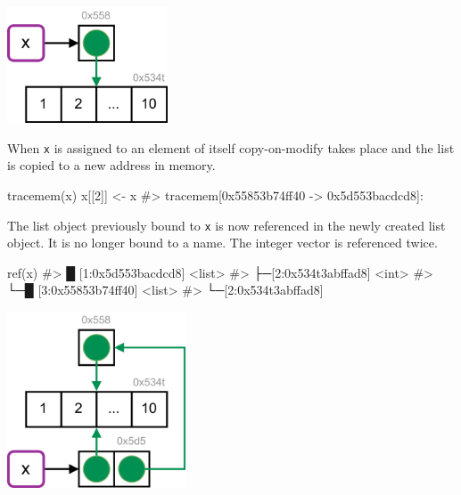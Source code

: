 \documentclass[
]{krantz}
\makeatletter
\newenvironment{Shaded}{\begin{snugshade}}{\end{snugshade}}
\newcommand{\CommentTok}[1]{\textcolor[rgb]{0.56,0.35,0.01}{\textit{#1}}}
\newcommand{\DecValTok}[1]{\textcolor[rgb]{0.00,0.00,0.81}{#1}}
\newcommand{\KeywordTok}[1]{\textcolor[rgb]{0.13,0.29,0.53}{\textbf{#1}}}
\newcommand{\NormalTok}[1]{#1}
\newcommand{\StringTok}[1]{\textcolor[rgb]{0.31,0.60,0.02}{#1}}
\newenvironment{kframe}{%
\medskip{}
\setlength{\fboxsep}{.8em}
 \def\at@end@of@kframe{}%
 \ifinner\ifhmode%
  \def\at@end@of@kframe{\end{minipage}}%
  \begin{minipage}{\columnwidth}%
 \fi\fi%
 \def\FrameCommand##1{\hskip\@totalleftmargin \hskip-\fboxsep
 \colorbox{shadecolor}{##1}\hskip-\fboxsep
     \hskip-\linewidth \hskip-\@totalleftmargin \hskip\columnwidth}%
 \MakeFramed {\advance\hsize-\width
   \@totalleftmargin\z@ \linewidth\hsize
   \@setminipage}}%
 {\par\unskip\endMakeFramed%
 \at@end@of@kframe}
\renewenvironment{Shaded}{\begin{kframe}}{\end{kframe}}
\renewcommand{\KeywordTok} [1]{\textcolor[rgb]{0.00,0.44,0.13}{{#1}}}
\renewcommand{\DecValTok}  [1]{\textcolor[rgb]{0.25,0.63,0.44}{{#1}}}
\renewcommand{\StringTok}  [1]{\textcolor[rgb]{0.25,0.44,0.63}{{#1}}}
\renewcommand{\CommentTok} [1]{\textcolor[rgb]{0.38,0.63,0.69}{{#1}}}
\renewcommand{\NormalTok}  [1]{{#1}}
\makeatother
\begin{document}
\begin{center}\includegraphics[width=135pt]{images/names_values/copy_on_modify_fig1} \end{center}

When \texttt{x} is assigned to an element of itself copy-on-modify takes place and the list is copied to a new address in memory.

\begin{Shaded}
\begin{Highlighting}[]
\KeywordTok{tracemem}\NormalTok{(x)}
\NormalTok{x[[}\DecValTok{2}\NormalTok{]] <-}\StringTok{ }\NormalTok{x}
\CommentTok{#> tracemem[0x55853b74ff40 -> 0x5d553bacdcd8]:}
\end{Highlighting}
\end{Shaded}

The list object previously bound to \texttt{x} is now referenced in the newly created list object. It is no longer bound to a name. The integer vector is referenced twice.

\begin{Shaded}
\begin{Highlighting}[]
\KeywordTok{ref}\NormalTok{(x)}
\CommentTok{#> █ [1:0x5d553bacdcd8] <list> }
\CommentTok{#> ├─[2:0x534t3abffad8] <int> }
\CommentTok{#> └─█ [3:0x55853b74ff40] <list> }
\CommentTok{#>   └─[2:0x534t3abffad8] }
\end{Highlighting}
\end{Shaded}

\begin{center}\includegraphics[width=150pt]{images/names_values/copy_on_modify_fig2} \end{center}
\end{document}
